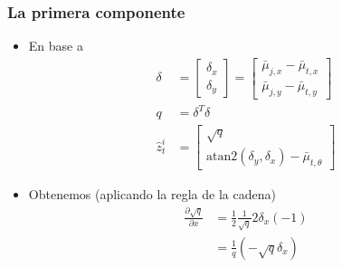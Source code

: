\begin{frame}
    \frametitle{La primera componente}

    \begin{itemize}
        \item En base a
        \begin{align*}
            \delta &= 
            \begin{bmatrix}
                \delta_x \\
                \delta_y
            \end{bmatrix}
            = \begin{bmatrix}
                \bar{\mu}_{j,x} - \bar{\mu}_{t,x} \\
                \bar{\mu}_{j,y} - \bar{\mu}_{t,y}
            \end{bmatrix}\\
            q &= \delta^T \delta\\
            \hat{z}^i_t &= 
            \begin{bmatrix}
                \sqrt{q} \\
                \text{atan2}(\delta_y, \delta_x) - \bar{\mu}_{t,\theta}
            \end{bmatrix}
        \end{align*}    
    
        \item Obtenemos (aplicando la regla de la cadena)
        \begin{align*}
            \frac{\partial \sqrt{q}}{\partial x}
            &= \frac{1}{2} \frac{1}{\sqrt{q}} 2 \delta_x (-1)\\
            &= \frac{1}{q} \left(-\sqrt{q} \delta_x \right)
        \end{align*} 
    \end{itemize}

\end{frame}

